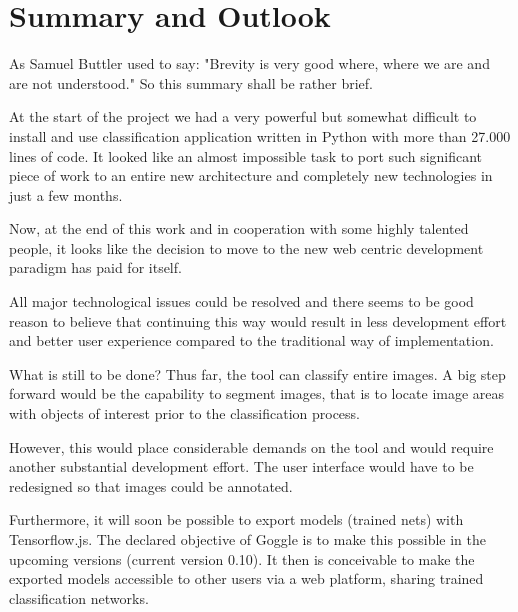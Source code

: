 \chapter{Summary and Outlook}

As Samuel Buttler used to say: "Brevity is very good where,
where we are and are not understood." So this summary shall be rather brief.

At the start of the project we had a very powerful but
somewhat difficult to install and use classification
 application written in Python with more than 27.000 lines of code. 
It looked like
an almost impossible task to port such significant piece of
work to an entire new architecture and completely new technologies in just a few months.

Now, at the end of this work and in cooperation with some 
highly talented people, it looks like the decision to
 move to the new web centric development paradigm has 
 paid for itself.

All major technological issues could be resolved and there seems to be good reason to believe that continuing this way
would result in less development effort and better user
experience compared to the traditional way of
implementation.

What is still to be done?
Thus far, the tool can classify entire images. A big step forward would be the capability to segment images, 
that is to locate image areas with objects of interest
prior to the classification process. 

However, this would place considerable demands on the tool and would
require another substantial development effort. The user interface would have to be redesigned so that 
images could be annotated.  

Furthermore, it will soon be possible to export models
 (trained nets) with Tensorflow.js. The declared objective
of Goggle is to make this possible in the upcoming
versions (current version 0.10). It then is conceivable
to make the exported models accessible to other users
via a web platform, sharing trained classification
networks. 
